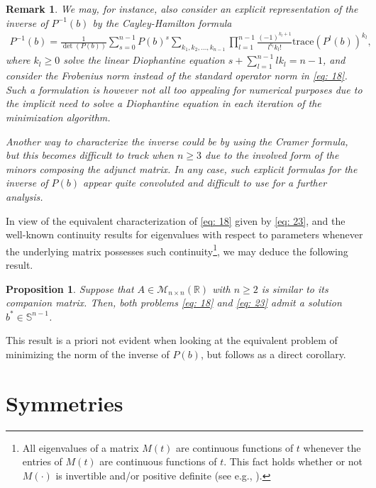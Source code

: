 \documentclass[11pt, a4paper, reqno]{amsart}
\newcommand{\R}{\mathbb{R}}
\theoremstyle{plain}
\numberwithin{equation}{section}
\newtheorem{remark}{Remark}
\newtheorem{proposition}{Proposition}[section]
\begin{document}
	\begin{remark}
	We may, for instance, also consider an explicit representation of the inverse of $P^{-1}(b)$ by the Cayley-Hamilton formula
	\begin{align*}
	P^{-1}(b) = {\frac {1}{\det(P(b))}}\sum _{s=0}^{n-1}P(b)^{s} \sum _{k_{1},k_{2},\ldots ,k_{n-1}}\prod _{l=1}^{n-1}{\frac {(-1)^{k_{l}+1}}{l^{k_{l}}k_{l}!}}\mathrm{trace}(P^{l}(b))^{k_{l}},
	\end{align*}
	where $k_l\geqslant0$ solve the linear Diophantine equation $\displaystyle s+\sum _{l=1}^{n-1}lk_{l}=n-1$, and consider the Frobenius norm instead of the standard operator norm in \eqref{eq: 18}. 
	 Such a formulation is however not all too appealing for numerical purposes due to the implicit need to solve a Diophantine equation in each iteration of the minimization algorithm.
	
	Another way to characterize the inverse could be by using the Cramer formula, but this becomes difficult to track when $n\geqslant3$ due to the involved form of the minors composing the adjunct matrix. In any case, such explicit formulas for the inverse of $P(b)$ appear quite convoluted and difficult to use for a further analysis.
	\end{remark}
	 
	 \noindent
	In view of the equivalent characterization of \eqref{eq: 18} given by \eqref{eq: 23}, and the well-known continuity results for eigenvalues with respect to parameters whenever the underlying matrix possesses such continuity\footnote{All eigenvalues of a matrix $M(t)$ are continuous functions of $t$ whenever the entries of $M(t)$ are continuous functions of $t$. This fact holds whether or not $M(\cdot)$ is invertible and/or positive definite (see e.g., \citep[pp. 116]{kato2013perturbation}).}, we may deduce the following result. 
	
	\begin{proposition} \label{prop: existence}
	Suppose that $A\in\mathcal{M}_{n\times n}(\R)$ with $n\geqslant2$ is similar to its companion matrix. 
	Then, both problems \eqref{eq: 18} and \eqref{eq: 23} admit a solution $b^* \in \mathbb{S}^{n-1}$.
	\end{proposition}
	
	\noindent
	This result is a priori not evident when looking at the equivalent problem of minimizing the norm of the inverse of $P(b)$, but follows as a direct corollary.
	
	\section{Symmetries}
	
\end{document}

